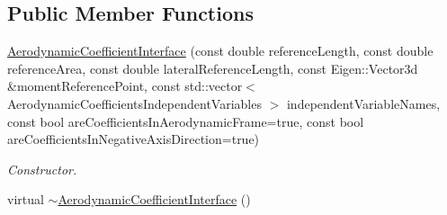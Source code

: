 \subsection*{Public Member Functions}
\begin{DoxyCompactItemize}
\item 
\hyperlink{classtudat_1_1aerodynamics_1_1AerodynamicCoefficientInterface_afcf63dcf774ca65e91ce8449f3e22d74}{Aerodynamic\+Coefficient\+Interface} (const double reference\+Length, const double reference\+Area, const double lateral\+Reference\+Length, const Eigen\+::\+Vector3d \&moment\+Reference\+Point, const std\+::vector$<$ Aerodynamic\+Coefficients\+Independent\+Variables $>$ independent\+Variable\+Names, const bool are\+Coefficients\+In\+Aerodynamic\+Frame=true, const bool are\+Coefficients\+In\+Negative\+Axis\+Direction=true)
\begin{DoxyCompactList}\small\item\em Constructor. \end{DoxyCompactList}\item 
virtual \hyperlink{classtudat_1_1aerodynamics_1_1AerodynamicCoefficientInterface_aa1df9aca23300659cd752d9afa42efa4}{$\sim$\+Aerodynamic\+Coefficient\+Interface} ()\hypertarget{classtudat_1_1aerodynamics_1_1AerodynamicCoefficientInterface_aa1df9aca23300659cd752d9afa42efa4}{}\label{classtudat_1_1aerodynamics_1_1AerodynamicCoefficientInterface_aa1df9aca23300659cd752d9afa42efa4}


\end{DoxyCompactItemize}

